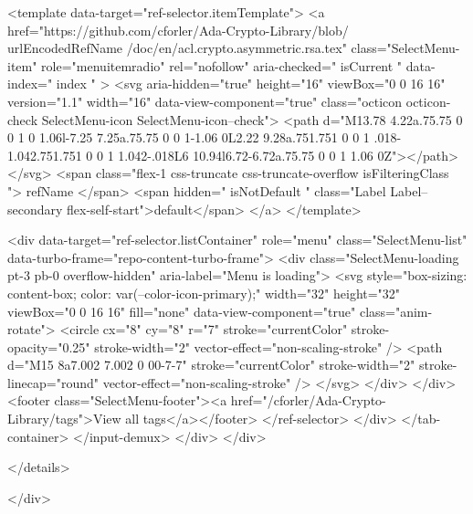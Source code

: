 <template data-target="ref-selector.itemTemplate">
  <a href="https://github.com/cforler/Ada-Crypto-Library/blob/{{ urlEncodedRefName }}/doc/en/acl.crypto.asymmetric.rsa.tex" class="SelectMenu-item" role="menuitemradio" rel="nofollow" aria-checked="{{ isCurrent }}" data-index="{{ index }}" >
    <svg aria-hidden="true" height="16" viewBox="0 0 16 16" version="1.1" width="16" data-view-component="true" class="octicon octicon-check SelectMenu-icon SelectMenu-icon--check">
    <path d="M13.78 4.22a.75.75 0 0 1 0 1.06l-7.25 7.25a.75.75 0 0 1-1.06 0L2.22 9.28a.751.751 0 0 1 .018-1.042.751.751 0 0 1 1.042-.018L6 10.94l6.72-6.72a.75.75 0 0 1 1.06 0Z"></path>
</svg>
    <span class="flex-1 css-truncate css-truncate-overflow {{ isFilteringClass }}">{{ refName }}</span>
    <span hidden="{{ isNotDefault }}" class="Label Label--secondary flex-self-start">default</span>
  </a>
</template>


            <div data-target="ref-selector.listContainer" role="menu" class="SelectMenu-list" data-turbo-frame="repo-content-turbo-frame">
              <div class="SelectMenu-loading pt-3 pb-0 overflow-hidden" aria-label="Menu is loading">
                <svg style="box-sizing: content-box; color: var(--color-icon-primary);" width="32" height="32" viewBox="0 0 16 16" fill="none" data-view-component="true" class="anim-rotate">
  <circle cx="8" cy="8" r="7" stroke="currentColor" stroke-opacity="0.25" stroke-width="2" vector-effect="non-scaling-stroke" />
  <path d="M15 8a7.002 7.002 0 00-7-7" stroke="currentColor" stroke-width="2" stroke-linecap="round" vector-effect="non-scaling-stroke" />
</svg>
              </div>
            </div>
              <footer class="SelectMenu-footer"><a href="/cforler/Ada-Crypto-Library/tags">View all tags</a></footer>
          </ref-selector>
        </div>
      </tab-container>
    </input-demux>
  </div>
</div>

  </details>

</div>


